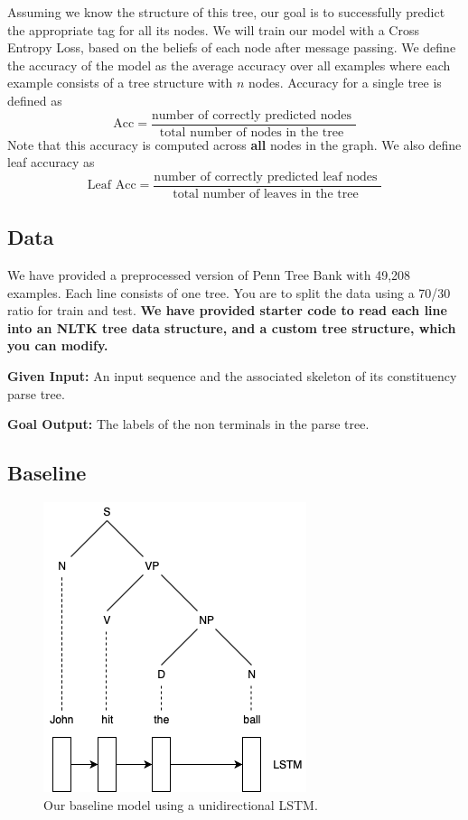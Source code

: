 \documentclass[11pt,addpoints,answers]{exam}
\numberwithin{equation}{section} %
\numberwithin{figure}{section} %
\numberwithin{table}{section} %
\begin{document}
Assuming we know the structure of this tree, our goal is to successfully predict the appropriate tag for all its nodes. 
We will train our model with a Cross Entropy Loss, based on the beliefs of each node after message passing. We define the accuracy of the model as the average accuracy over all examples where each example consists of a tree structure with $n$ nodes. Accuracy for a single tree is defined as $$ \text{Acc} = \frac{\text{number of correctly predicted nodes }}{ \text{total number of nodes in the tree }}$$
Note that this accuracy is computed across \textbf{all} nodes in the graph. We also define leaf accuracy as 
$$ \text{Leaf Acc} = \frac{\text{number of correctly predicted leaf nodes }}{ \text{total number of leaves in the tree }}$$



\subsection{Data}

We have provided a preprocessed version of Penn Tree Bank with 49,208 examples. Each line consists of one tree. You are to split the data using a 70/30 ratio for train and test. 
\newline
\textbf{We have provided starter code to read each line into an NLTK tree data structure, and a custom tree structure, which you can modify.} 

\textbf{Given Input:} An input sequence and the associated skeleton of its constituency parse tree.

\textbf{Goal Output:} The labels of the non terminals in the parse tree.


\subsection{Baseline}


\begin{figure}[h]
\centering
\includegraphics[width=0.45\linewidth]{fig/baseline.png}
\caption{Our baseline model using a unidirectional LSTM.}
\label{learned_interp}
\end{figure}
\end{document}
